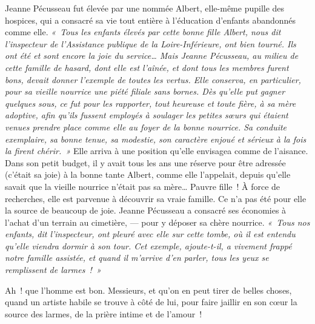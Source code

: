\documentclass[french,twoside]{book} %
\newcommand\orgName[1]{#1}
\newcommand\persName[1]{#1}
\newcommand\placeName[1]{#1}
\begin{document}
{\persName Jeanne Pécusseau} fut élevée par une nommée Albert, elle-même pupille des hospices, qui a consacré sa vie tout entière à l’éducation d’enfants abandonnés comme elle. \emph{« Tous les enfants élevés par cette bonne {\persName fille Albert}, nous dit l’inspecteur de l’{\orgName Assistance publique} de la {\placeName Loire-Inférieure}, ont bien tourné. Ils ont été et sont encore la joie du service… Mais {\persName Jeanne Pécusseau}, au milieu de cette famille de hasard, dont elle est l’aînée, et dont tous les membres furent bons, devait donner l’exemple de toutes les vertus. Elle conserva, en particulier, pour sa vieille nourrice une piété filiale sans bornes. Dès qu’elle put gagner quelques sous, ce fut pour les rapporter, tout heureuse et toute fière, à sa mère adoptive, afin qu’ils fussent employés à soulager les petites sœurs qui étaient venues prendre place comme elle au foyer de la bonne nourrice. Sa conduite exemplaire, sa bonne tenue, sa modestie, son caractère enjoué et sérieux à la fois la firent chérir. »} Elle arriva à une position qu’elle envisagea comme de l’aisance. Dans son petit budget, il y avait tous les ans une réserve pour être adressée (c’était sa joie) à la bonne {\persName tante Albert}, comme elle l’appelait, depuis qu’elle savait que la vieille nourrice n’était pas sa mère… Pauvre fille ! À force de recherches, elle est parvenue à découvrir sa vraie famille. Ce n’a pas été pour elle la source de beaucoup de joie. {\persName Jeanne Pécusseau} a consacré ses économies à l’achat d’un terrain au cimetière, — pour y déposer sa chère nourrice. \emph{« Tous nos enfants, dit l’inspecteur, ont pleuré avec elle sur cette tombe, où il est entendu qu’elle viendra dormir à son tour. Cet exemple, ajoute-t-il, a vivement frappé notre famille assistée, et quand il m’arrive d’en parler, tous les yeux se remplissent de larmes ! »}\par
Ah ! que l’homme est bon. Messieurs, et qu’on en peut tirer de belles choses, quand un artiste habile se trouve à côté de lui, pour faire jaillir en son cœur la source des larmes, de la prière intime et de l’amour !\par
\end{document}
